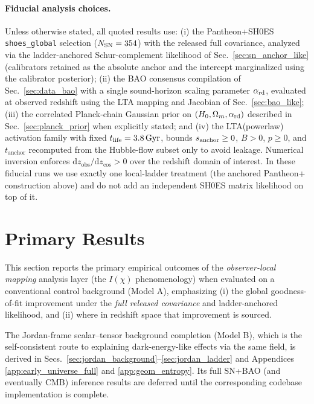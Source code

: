 \documentclass[10pt]{article}
\newcommand{\zobs}{z_{\mathrm{obs}}}
\newcommand{\zcos}{z_{\mathrm{cos}}}
\newcommand{\tL}{t_{\mathrm{life}}}
\newcommand{\tA}{t_{\mathrm{anchor}}}
\providecommand{\dd}{\mathrm{d}}
\begin{document}
\paragraph{Fiducial analysis choices.}
Unless otherwise stated, all quoted results use: (i) the Pantheon+SH0ES \texttt{shoes\_global}
selection (\(N_{\rm SN}=354\)) with the released full covariance, analyzed via the ladder-anchored
Schur-complement likelihood of Sec.~\ref{sec:sn_anchor_like} (calibrators retained as the absolute
anchor and the intercept marginalized using the calibrator posterior); (ii) the BAO consensus
compilation of Sec.~\ref{sec:data_bao} with a single sound-horizon scaling parameter
\(\alpha_{\rm rd}\), evaluated at observed redshift using the LTA mapping and Jacobian of
Sec.~\ref{sec:bao_like}; (iii) the correlated Planck-chain Gaussian prior on
\((H_0,\Omega_m,\alpha_{\rm rd})\) described in Sec.~\ref{sec:planck_prior} when explicitly stated;
and (iv) the LTA(powerlaw) activation family with fixed \(\tL=3.8\,{\rm Gyr}\), bounds
\(s_{\rm anchor}\ge0\), \(B>0\), \(p\ge0\), and \(\tA\) recomputed from the Hubble-flow subset only to
avoid leakage. Numerical inversion enforces \(\dd \zobs/\dd \zcos>0\) over the redshift domain of
interest. In these fiducial runs we use exactly one local-ladder treatment (the anchored Pantheon+
construction above) and do not add an independent SH0ES matrix likelihood on top of it.
\section{Primary Results}
\label{sec:results}

This section reports the primary empirical outcomes of the \emph{observer-local mapping} analysis
layer (the \(I(\chi)\) phenomenology) when evaluated on a conventional control background (Model A),
emphasizing (i) the global goodness-of-fit improvement under the \emph{full released covariance} and
ladder-anchored likelihood, and (ii) where in redshift space that improvement is sourced.

The Jordan-frame scalar--tensor background completion (Model B), which is the self-consistent route
to explaining dark-energy-like effects via the same field, is derived in
Secs.~\ref{sec:jordan_background}--\ref{sec:jordan_ladder} and Appendices
\ref{app:early_universe_full} and \ref{app:geom_entropy}. Its full SN+BAO (and eventually CMB)
inference results are deferred until the corresponding codebase implementation is complete.
\end{document}
